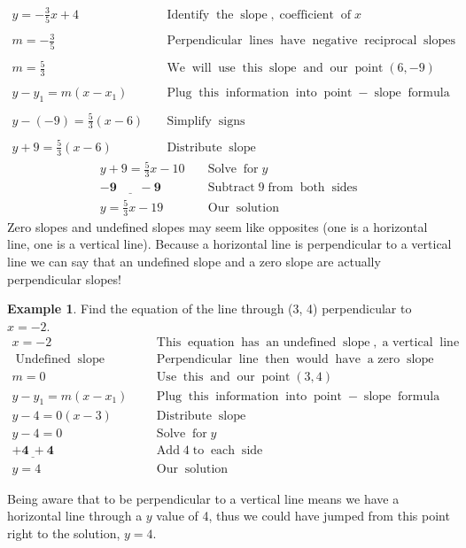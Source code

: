 \documentclass[12pt]{book}
\theoremstyle{definition}
\newtheorem{example}{Example}
\newcommand{\tmmathbf}[1]{\ensuremath{\boldsymbol{#1}}}
\newcommand{\tmop}[1]{\ensuremath{\operatorname{#1}}}
\begin{document}
  \begin{eqnarray*}
    y = - \frac{3}{5} x + 4 &  & \tmop{Identify} \tmop{the} \tmop{slope},
    \tmop{coefficient} \tmop{of} x\\
    &  & \\
    m = - \frac{3}{5} &  & \tmop{Perpendicular} \tmop{lines} \tmop{have}
    \tmop{negative} \tmop{reciprocal} \tmop{slopes}\\
    &  & \\
    m = \frac{5}{3} &  & \tmop{We} \tmop{will} \tmop{use} \tmop{this}
    \tmop{slope} \tmop{and} \tmop{our} \tmop{point} (6, - 9) \\
    &  & \\
    y - y_1 = m (x - x_1) &  & \tmop{Plug} \tmop{this} \tmop{information}
    \tmop{into} \tmop{point} - \tmop{slope} \tmop{formula}\\
    &  & \\
    y - (- 9) = \frac{5}{3} (x - 6) &  & \tmop{Simplify} \tmop{signs}\\
    &  & \\
    y + 9 = \frac{5}{3} (x - 6) &  & \tmop{Distribute} \tmop{slope}
  \end{eqnarray*}
  \begin{eqnarray*}
    y + 9 = \frac{5}{3} x - 10 &  & \tmop{Solve} \tmop{for} y\\
    \tmmathbf{\underline{- 9 ~~~~~~~~- 9}} &  & \tmop{Subtract} 9 \tmop{from} \tmop{both}
    \tmop{sides}\\
    y = \frac{5}{3} x - 19 &  & \tmop{Our} \tmop{solution}
  \end{eqnarray*}
Zero slopes and undefined slopes may seem like opposites (one is a horizontal line, one is a vertical line). Because a horizontal line is perpendicular to a vertical line we can say that an undefined slope and a zero slope are actually perpendicular slopes!
\begin{example}\label{Lin73} Find the equation of the line through (3, 4) perpendicular to $x = - 2$.
  \begin{eqnarray*}
    x = - 2~~ &  & \tmop{This} \tmop{equation} \tmop{has} \tmop{an~undefined}
    \tmop{slope}, \tmop{a~vertical} \tmop{line}\\
    \tmop{Undefined} \tmop{slope}~~ &  & \tmop{Perpendicular} \tmop{line} \tmop{then}
    \tmop{would} \tmop{have} \tmop{a~zero} \tmop{slope}\\
    m = 0~~ &  & \tmop{Use} \tmop{this} \tmop{and} \tmop{our} \tmop{point} (3,
    4)\\
    y - y_1 = m (x - x_1)~~ &  & \tmop{Plug} \tmop{this} \tmop{information}
    \tmop{into} \tmop{point} - \tmop{slope} \tmop{formula}\\
    y - 4 = 0 (x - 3)~~ &  & \tmop{Distribute} \tmop{slope}\\
    y - 4 = 0~~ &  & \tmop{Solve} \tmop{for} y\\
    \tmmathbf{\underline{+ 4 ~+ 4}} &  & \tmop{Add} 4 \tmop{to} \tmop{each} \tmop{side}\\
    y = 4~~ &  & \tmop{Our} \tmop{solution}
  \end{eqnarray*}
\end{example}
Being aware that to be perpendicular to a vertical line means we have a horizontal line through a $y$ value of 4, thus we could have jumped from this point right to the solution, $y = 4$.
\end{document}
